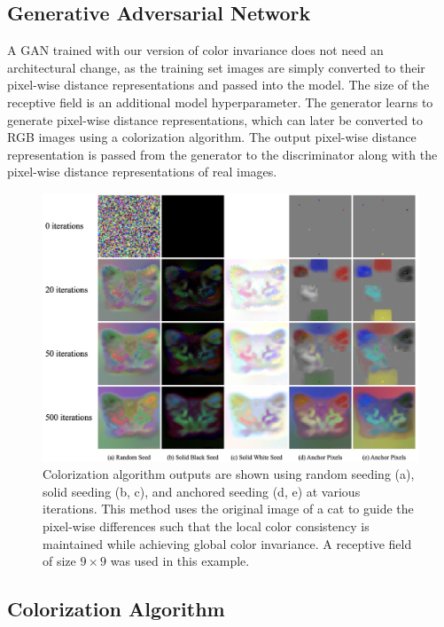 \documentclass[10pt,twocolumn,letterpaper]{article}
\begin{document}
\subsection{Generative Adversarial Network}
A GAN \cite{Goodfellow14} trained with our version of color invariance does not need an architectural change, as the training set images are simply converted to their pixel-wise distance representations and passed into the model. The size of the receptive field is an additional model hyperparameter. The generator learns to generate pixel-wise distance representations, which can later be converted to RGB images using a colorization algorithm. The output pixel-wise distance representation is passed from the generator to the discriminator along with the pixel-wise distance representations of real images.

\begin{figure}
    \centering
    \includegraphics[width=\linewidth]{images/recolorization_grid.png}
    \caption{Colorization algorithm outputs are shown using random seeding (a), solid seeding (b, c), and anchored seeding (d, e) at various iterations. This method uses the original image of a cat to guide the pixel-wise differences such that the local color consistency is maintained while achieving global color invariance. A receptive field of size $9\times9$ was used in this example.}
    \label{recolorization_grid}
\end{figure}

\subsection{Colorization Algorithm}
\end{document}
